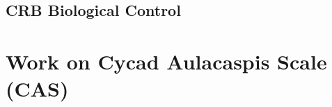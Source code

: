 \documentclass[]{scrartcl}
\begin{document}
\subsection{CRB Biological Control}

\section{Work on Cycad Aulacaspis Scale (CAS)}

\newpage
\printbibliography
\end{document}
